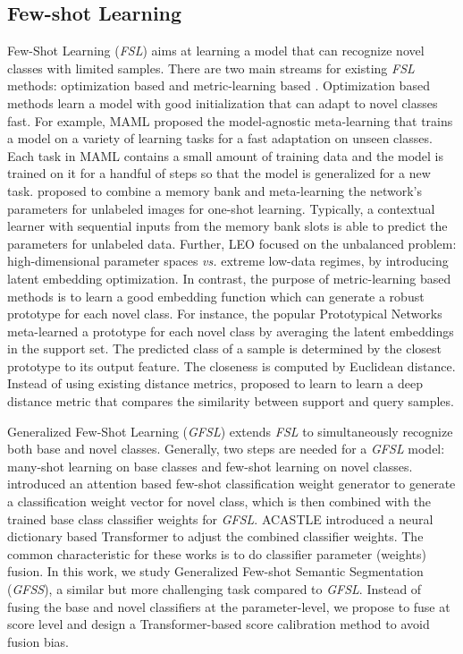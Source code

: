 \documentclass[journal]{IEEEtran}
\begin{document}
\subsection{Few-shot Learning}
Few-Shot Learning (\textit{FSL}) aims at learning a model that can recognize novel classes with limited samples. 
There are two main streams for existing \textit{FSL} methods: optimization based \cite{cai2018memory,finn2017model,rusu2018meta} and metric-learning based \cite{snell2017prototypical,sung2018learning,vinyals2016matching,zhang2020deepemd,qi2018low}. 
Optimization based methods learn a model with good initialization that can adapt to novel classes fast.
For example, MAML \cite{finn2017model} proposed the model-agnostic meta-learning that trains a model on a variety of learning tasks for a fast adaptation on unseen classes.
Each task in MAML contains a small amount of training data and the model is trained on it for a handful of steps so that the model is generalized for a new task.
\cite{cai2018memory} proposed to combine a memory bank and meta-learning the network's parameters for unlabeled images for one-shot learning.
Typically, a contextual learner with sequential inputs from the memory bank slots is able to predict the parameters for unlabeled data.
Further, LEO \cite{rusu2018meta} focused on the unbalanced problem: high-dimensional parameter spaces \textit{vs.} extreme low-data regimes, by introducing latent embedding optimization.
In contrast, the purpose of metric-learning based methods is to learn a good embedding function which can generate a robust prototype for each novel class.
For instance, the popular Prototypical Networks \cite{snell2017prototypical} meta-learned a prototype for each novel class by averaging the latent embeddings in the support set.
The predicted class of a sample is determined by the closest prototype to its output feature.
The closeness is computed by Euclidean distance.
Instead of using existing distance metrics, \cite{sung2018learning} proposed to learn to learn a deep distance metric that compares the similarity between support and query samples.


Generalized Few-Shot Learning (\textit{GFSL}) \cite{hariharan2017low} extends \textit{FSL} to simultaneously recognize both base and novel classes.
Generally, two steps are needed for a \textit{GFSL} model: many-shot learning on base classes and few-shot learning on novel classes.
\cite{gidaris2018dynamic} introduced an attention based few-shot classification weight generator to generate a classification weight vector for novel class, which is then combined with the trained base class classifier weights for \textit{GFSL}.
ACASTLE \cite{ye2021learning} introduced a neural dictionary based Transformer to adjust the combined classifier weights. 
The common characteristic for these works is to do classifier parameter (weights) fusion.
In this work, we study Generalized Few-shot Semantic Segmentation (\textit{GFSS}), a similar but more challenging task compared to \textit{GFSL}.
Instead of fusing the base and novel classifiers at the  parameter-level, we propose to fuse at score level and design a Transformer-based score calibration method to avoid fusion bias.
\end{document}
